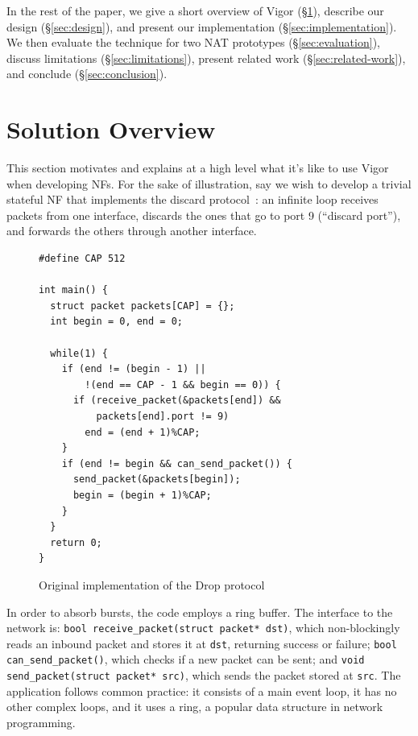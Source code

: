 \documentclass[letterpaper,twocolumn,10pt]{article}
\newcommand{\code}[1]{\lstinline{#1}}
\begin{document}
In the rest of the paper, we give a short overview of Vigor (\S\ref{sec:solution-overview}), describe our design (\S\ref{sec:design}), and present our implementation (\S\ref{sec:implementation}). We then evaluate the technique for two NAT prototypes (\S\ref{sec:evaluation}), discuss limitations (\S\ref{sec:limitations}), present related work (\S\ref{sec:related-work}), and conclude (\S\ref{sec:conclusion}).


\section{Solution Overview}
\label{sec:solution-overview}

This section motivates and explains at a high level what it's like to use Vigor when developing NFs. For the sake of illustration, say we wish to develop a trivial stateful NF that implements the discard protocol~\cite{rfc863}: an infinite loop receives packets from one interface, discards the ones that go to port 9 (``discard port''), and forwards the others through another interface.

\begin{figure}[h!]
\begin{lstlisting}
#define CAP 512

int main() {
  struct packet packets[CAP] = {};
  int begin = 0, end = 0;

  while(1) {
    if (end != (begin - 1) || 
        !(end == CAP - 1 && begin == 0)) {
      if (receive_packet(&packets[end]) && 
          packets[end].port != 9)
        end = (end + 1)%CAP;
    }
    if (end != begin && can_send_packet()) {
      send_packet(&packets[begin]);
      begin = (begin + 1)%CAP;
    }
  }
  return 0;
}
\end{lstlisting}
  \caption{Original implementation of the Drop protocol}
  \label{lst:orig}
\end{figure}

In order to absorb bursts, the code employs a ring buffer. The interface to the
network is: \code{bool receive_packet(struct packet* dst)}, which
non-blockingly reads an inbound packet and stores it at \code{dst}, returning success or failure; \code{bool can_send_packet()}, which checks if a new packet can be sent; and \code{void send_packet(struct packet* src)}, which sends the packet stored at \code{src}. The application follows common practice: it consists of a main event loop, it has no other complex loops, and it uses a ring, a popular data structure in network programming.
\end{document}
